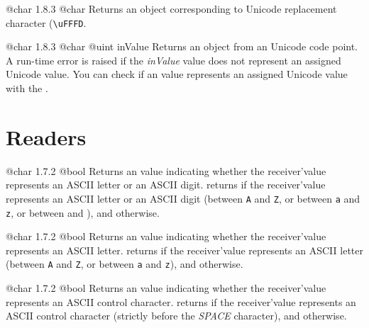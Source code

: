 {@char}
{1.8.3}
{@char}
{Returns an  object corresponding to Unicode replacement character (\texttt{\textquotesingle\textbackslash uFFFD}.}
{}







{@char}
{1.8.3}
{@char}
{@uint inValue}
{Returns an  object from an Unicode code point.}
{A run-time error is raised if the \emph{inValue} value does not represent an assigned Unicode value. You can check if an  value represents an assigned Unicode value with the .}


\section{Readers}


{@char}
{1.7.2}
{@bool}
{Returns an  value indicating whether the receiver'value represents an ASCII letter or an ASCII digit.}
{returns  if the receiver'value represents an ASCII letter or an ASCII digit (between \texttt{\textquotesingle A\textquotesingle} and \texttt{\textquotesingle Z\textquotesingle}, or between \texttt{\textquotesingle a\textquotesingle} and \texttt{\textquotesingle z\textquotesingle}, or between \texttt{\textquotesingle} and \texttt{\textquotesingle}), and  otherwise.}




{@char}
{1.7.2}
{@bool}
{Returns an  value indicating whether the receiver'value represents an ASCII letter.}
{returns  if the receiver'value represents an ASCII letter (between \texttt{\textquotesingle A\textquotesingle} and \texttt{\textquotesingle Z\textquotesingle}, or between \texttt{\textquotesingle a\textquotesingle} and \texttt{\textquotesingle z\textquotesingle}), and  otherwise.}




{@char}
{1.7.2}
{@bool}
{Returns an  value indicating whether the receiver'value represents an ASCII control character.}
{returns  if the receiver'value represents an ASCII control character (strictly before the \emph{SPACE} character), and  otherwise.}





